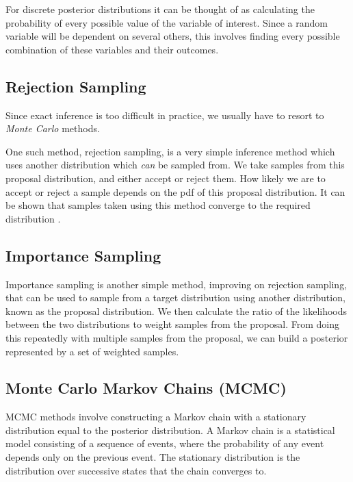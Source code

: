 For discrete posterior distributions it can be thought of as calculating the probability of every possible value of the variable of interest. Since a random variable will be dependent on several others, this involves finding every possible combination of these variables and their outcomes.

\subsection{Rejection Sampling}
	
Since exact inference is too difficult in practice, we usually have to resort to \textit{Monte Carlo} \cite{monte-carlo} methods.
	
One such method, rejection sampling, is a very simple inference method which uses another distribution which \textit{can} be sampled from. We take samples from this proposal distribution, and either accept or reject them. How likely we are to accept or reject a sample depends on the pdf of this proposal distribution. It can be shown that samples taken using this method converge to the required distribution \cite{flury1990acceptance}. 
	
\subsection{Importance Sampling}
	
Importance sampling is another simple method, improving on rejection sampling, that can be used to sample from a target distribution using another distribution, known as the proposal distribution. We then calculate the ratio of the likelihoods between the two distributions to weight samples from the proposal. From doing this repeatedly with multiple samples from the proposal, we can build a posterior represented by a set of weighted samples.
	
	
\subsection{Monte Carlo Markov Chains (MCMC)}
	
MCMC methods involve constructing a Markov chain with a stationary distribution equal to the posterior distribution. A Markov chain is a statistical model consisting of a sequence of events, where the probability of any event depends only on the previous event. The stationary distribution is the distribution over successive states that the chain converges to.
	
